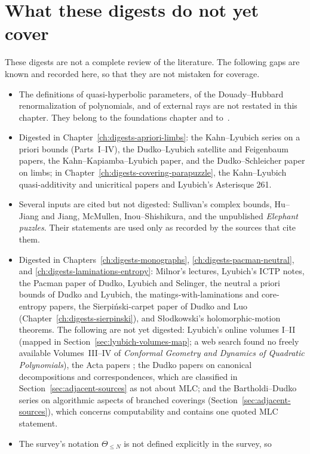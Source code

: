 \section{What these digests do not yet cover}
\label{sec:digests-gaps}

These digests are not a complete review of the literature.  The following gaps
are known and recorded here, so that they are not mistaken for coverage.
\begin{itemize}
\item The definitions of quasi-hyperbolic parameters, of the Douady--Hubbard
  renormalization of polynomials, and of external rays are not restated in this
  chapter.  They belong to the foundations chapter and to~\cite{DH}.
\item Digested in Chapter~\ref{ch:digests-apriori-limbs}: the Kahn--Lyubich series on a priori bounds (Parts~I--IV), the
  Dudko--Lyubich satellite and Feigenbaum papers, the Kahn--Kapiamba--Lyubich paper, and the Dudko--Schleicher paper on limbs; in Chapter~\ref{ch:digests-covering-parapuzzle}, the Kahn--Lyubich quasi-additivity and unicritical papers and Lyubich's Asterisque 261.
\item Several inputs are cited but not digested: Sullivan's complex bounds, Hu--Jiang
  and Jiang, McMullen, Inou--Shishikura, and the unpublished
  \emph{Elephant puzzles}.  Their statements are used only as recorded by the
  sources that cite them.
\item Digested in Chapters~\ref{ch:digests-monographs}, \ref{ch:digests-pacman-neutral}, and
  \ref{ch:digests-laminations-entropy}: Milnor's lectures, Lyubich's ICTP notes, the Pacman paper of Dudko,
  Lyubich and Selinger, the neutral a priori bounds of Dudko and Lyubich, the matings-with-laminations and
  core-entropy papers, the Sierpi\'nski-carpet paper of Dudko and Luo (Chapter~\ref{ch:digests-sierpinski}), and Słodkowski's holomorphic-motion theorems.  The following are not yet digested:
  Lyubich's online volumes I--II (mapped in Section~\ref{sec:lyubich-volumes-map}; a web search found no freely available Volumes~III--IV of
  \emph{Conformal Geometry and Dynamics of Quadratic Polynomials}), the Acta papers \cite{LyubichDynamics}; the Dudko papers on
  canonical decompositions and correspondences, which are
  classified in Section~\ref{sec:adjacent-sources} as not about MLC; and the Bartholdi--Dudko series on
  algorithmic aspects of branched coverings (Section~\ref{sec:adjacent-sources}), which concerns computability and contains one quoted MLC statement.
\item The survey's notation $\Theta_{\le N}$ is not defined explicitly in the survey, so

\end{itemize}
